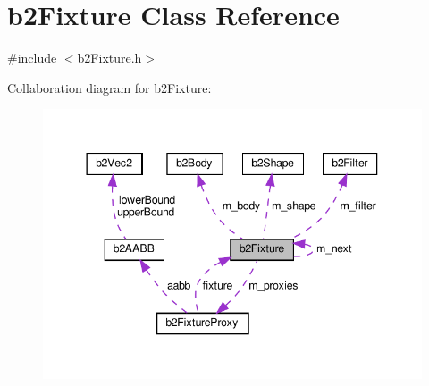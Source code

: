 \hypertarget{classb2Fixture}{}\section{b2\+Fixture Class Reference}
\label{classb2Fixture}


{\ttfamily \#include $<$b2\+Fixture.\+h$>$}



Collaboration diagram for b2\+Fixture\+:
\nopagebreak
\begin{figure}[H]
\begin{center}
\leavevmode
\includegraphics[width=344pt]{classb2Fixture__coll__graph}
\end{center}
\end{figure}
